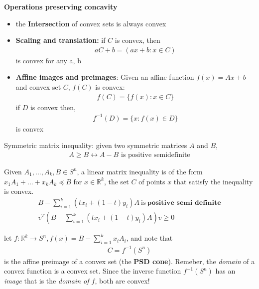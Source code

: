 \documentclass{article}
\begin{document}
\begin{note}
  \textbf{Operations preserving concavity}
  \begin{itemize}
    \item the \textbf{Intersection} of convex sets is always convex
    \item \textbf{Scaling and translation:} if $C$ is convex, then
          \begin{align}
            aC+b=(ax+b:x\in C)
          \end{align}
          is convex for any a, b
    \item \textbf{Affine images and preimages}: Given an affine function
          $f(x)=Ax+b$ and convex set $C$, $f(C)$ is convex:
          \begin{align}
            f(C)=\{f(x):x\in C\}
          \end{align}
          if $D$ is convex then,
          \begin{align*}
            f^{-1}(D)=\{x:f(x)\in D\}
          \end{align*}
          is convex
  \end{itemize}
\end{note}
\sectionbreak
\begin{definition}
  Symmetric matrix inequality: given two symmetric matrices $A$ and $B$,
  \begin{align}
    A\geq B\longleftrightarrow A-B\text{~is positive semidefinite}
  \end{align}
\end{definition}
\begin{headered_note}
  Given $A_1,...,A_k,B\in S^n$, a linear matrix inequality is of the form
  $x_1A_1+...+x_kA_k\preceq B$ for $x\in \mathbb{R}^k$, the set $C$ of points
  $x$ that satisfy the inequality is convex.
  \begin{align}
    \nonumber
    B-\sum_{i=1}^k(tx_i+(1-t)y_i)A~\text{is}~\textbf{positive semi definite} \\
    v^T\left(B-\sum_{i=1}^k (tx_i+(1-t)y_i)A\right)v\geq 0
  \end{align}
  \begin{headered_note}
    let $f:\mathbb{R}^k\rightarrow S^n,f(x)=B-\sum_{i=1}^kx_iA_i$, and note that
    \begin{align}
      C=f^{-1}(S^n)
    \end{align}
    is the affine preimage of a convex set (the \textbf{PSD cone}).  Remeber, the
    \textit{domain} of a convex function is a convex set.  Since the inverse
    function $f^{-1}(S^n)$ has an \textit{image} that is the \textit{domain of $f$},
    both are convex!
  \end{headered_note}
\end{headered_note}
\end{document}
